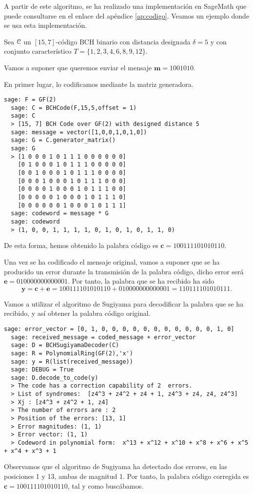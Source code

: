A partir de este algoritmo, se ha realizado una implementación en SageMath \cite{SageMath2022} que puede consultarse en el enlace del apéndice \ref{ap:codigo}. Veamos un ejemplo donde se usa esta implementación.

\begin{ejemplo}
Sea $\mathcal C$ un $[15,7]$-código BCH binario con distancia designada $\delta = 5$ y con conjunto característico $T = \{1, 2, 3, 4, 6, 8, 9, 12\}$.

Vamos a suponer que queremos enviar el mensaje $\mathbf{m} = 1001010$.

En primer lugar, lo codificamos mediante la matriz generadora.
\begin{lstlisting}[gobble=1]
  sage: F = GF(2)
  sage: C = BCHCode(F,15,5,offset = 1)
  sage: C
  > [15, 7] BCH Code over GF(2) with designed distance 5
  sage: message = vector([1,0,0,1,0,1,0])
  sage: G = C.generator_matrix()
  sage: G
  > [1 0 0 0 1 0 1 1 1 0 0 0 0 0 0]
    [0 1 0 0 0 1 0 1 1 1 0 0 0 0 0]
    [0 0 1 0 0 0 1 0 1 1 1 0 0 0 0]
    [0 0 0 1 0 0 0 1 0 1 1 1 0 0 0]
    [0 0 0 0 1 0 0 0 1 0 1 1 1 0 0]
    [0 0 0 0 0 1 0 0 0 1 0 1 1 1 0]
    [0 0 0 0 0 0 1 0 0 0 1 0 1 1 1]
  sage: codeword = message * G
  sage: codeword
  > (1, 0, 0, 1, 1, 1, 1, 0, 1, 0, 1, 0, 1, 1, 0)
\end{lstlisting}

De esta forma, hemos obtenido la palabra código es $\mathbf c = 100111101010110$.

Una vez se ha codificado el mensaje original, vamos a suponer que se ha producido un error durante la transmisión de la palabra código, dicho error será $\mathbf e = 010000000000001$. Por tanto, la palabra que se ha recibido ha sido
$$\mathbf y = \mathbf c + \mathbf e = 100111101010110 + 010000000000001 = 110111101010111.$$


Vamos a utilizar el algoritmo de Sugiyama para decodificar la palabra que se ha recibido, y así obtener la palabra código original.

\begin{lstlisting}[gobble=1]
  sage: error_vector = [0, 1, 0, 0, 0, 0, 0, 0, 0, 0, 0, 0, 0, 1, 0]
  sage: received_message = coded_message + error_vector
  sage: D = BCHSugiyamaDecoder(C)
  sage: R = PolynomialRing(GF(2),'x')
  sage: y = R(list(received_message))
  sage: DEBUG = True
  sage: D.decode_to_code(y)
  > The code has a correction capability of 2  errors.
  > List of syndromes:  [z4^3 + z4^2 + z4 + 1, z4^3 + z4, z4, z4^3]
  > Xj : [z4^3 + z4^2 + 1, z4]
  > The number of errors are : 2
  > Position of the errors: [13, 1]
  > Error magnitudes: (1, 1)
  > Error vector: (1, 1)
  > Codeword in polynomial form:  x^13 + x^12 + x^10 + x^8 + x^6 + x^5 + x^4 + x^3 + 1
\end{lstlisting}

Observamos que el algoritmo de Sugiyama ha detectado dos errores, en las posiciones 1 y 13, ambas de magnitud 1. Por tanto, la palabra código corregida es $\mathbf c = 100111101010110$, tal y como buscábamos.


\end{ejemplo}


  

\endinput